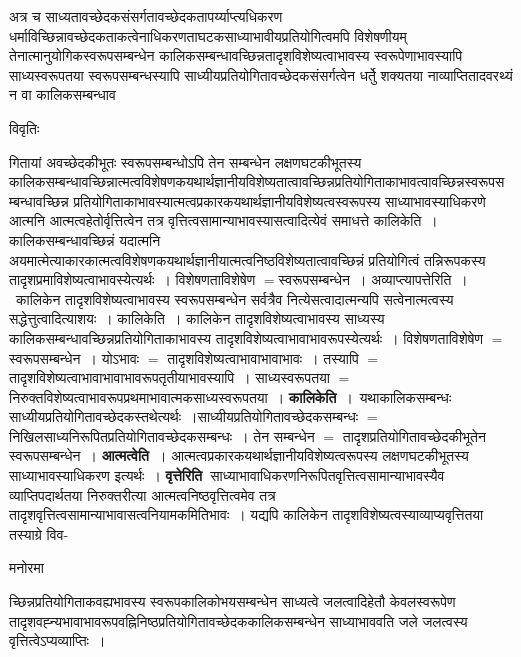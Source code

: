 \documentclass[10pt, openany]{book}
\begin{document}
{अत्र च
साध्यतावच्छेदकसंसर्गतावच्छेदकतापर्य्याप्त्यधिकरण धर्माविच्छिन्नावच्छेदकताकत्वेनाधिकरणताघटकसाध्याभावीयप्रतियोगित्वमपि विशेषणीयम् तेनात्मानुयोगिकस्वरूपसम्बन्धेन कालिकसम्बन्धावच्छिन्नतादृशविशेष्यत्वाभावस्य स्वरूपेणाभावस्यापि साध्यस्वरूपतया स्वरूपसम्बन्धस्यापि
साध्यीयप्रतियोगितावच्छेदकसंसर्गत्वेन धर्तेु शक्यतया नाव्याप्तितादवरथ्यं न वा कालिकसम्बन्धाव
\newpage
\begin{center}     विवृतिः \end{center}
गितायां अवच्छेदकीभूतः स्वरूपसम्बन्धोऽपि तेन सम्बन्धेन लक्षणघटकीभूतस्य
कालिकसम्बन्धावच्छिन्नात्मत्वविशेषणकयथार्थज्ञानीयविशेष्यतात्वावच्छिन्नप्रतियोगिताकाभावत्वावच्छिन्नस्वरूपसम्बन्धावच्छिन्न प्रतियोगिताकाभावस्यात्मत्वप्रकारकयथार्थज्ञानीयविशेष्यत्वस्वरूपस्य साध्याभावस्याधिकरणे आत्मनि आत्मत्वहेतोर्वृत्तित्वेन तत्र वृत्तित्वसामान्याभावस्यासत्वादित्येवं समाधत्ते {\qt कालिकेति~}। कालिकसम्बन्धावच्छिन्नं यदात्मनि अयमात्मेत्याकारकात्मत्वविशेषणकयथार्थज्ञानीयात्मत्वनिष्ठविशेष्यतात्वावच्छिन्नं प्रतियोगित्वं तन्निरूपकस्य तादृशप्रमाविशेष्यत्वाभावस्येत्यर्थः~। विशेषणताविशेषेण $=$स्वरूपसम्बन्धेन~। {\qt अव्याप्त्यापत्तेरिति~}।~कालिकेन तादृशविशेष्यत्वाभावस्य स्वरूपसम्बन्धेन सर्वत्रैव नित्येसत्वादात्मन्यपि सत्वेनात्मत्वस्य सद्धेत्तुत्वादित्याशयः~। {\qt कालिकेति~}। कालिकेन तादृशविशेष्यत्वाभावस्य साध्यस्य कालिकसम्बन्धावच्छिन्नप्रतियोगिताकाभावस्य तादृशविशेष्यत्वाभावाभावरूपस्येत्यर्थः~। विशेषणताविशेषेण $=$ स्वरूपसम्बन्धेन~। योऽभावः $=$ तादृशविशेष्यत्वाभावाभावाभावः~। तस्यापि $=$ तादृशविशेष्यत्वाभावाभावाभावरूपतृतीयाभावस्यापि~। साध्यस्वरूपतया $=$ निरुक्तविशेष्यत्वाभावरूपप्रथमाभावात्मकसाध्यस्वरूपतया~। \textbf {\qt कालिकेति}~।~यथाकालिकसम्बन्धः साध्यीयप्रतियोगितावच्छेदकस्तथेत्यर्थः~।साध्यीयप्रतियोगितावच्छेदकसम्बन्धः $=$ निखिलसाध्यनिरूपितप्रतियोगितावच्छेदकसम्बन्धः~। तेन सम्बन्धेन $=$ तादृशप्रतियोगितावच्छेदकीभूतेन स्वरूपसम्बन्धेन~। \textbf {\qt आत्मत्वेति~}। आत्मत्वप्रकारकयथार्थज्ञानीयविशेष्यत्वरूपस्य लक्षणघटकीभूतस्य साध्याभावस्याधिकरण इत्यर्थः~। \textbf {\qt वृत्तेरिति~}साध्याभावाधिकरणनिरूपितवृत्तित्वसामान्याभावस्यैव व्याप्तिपदार्थतया निरुक्तरीत्या आत्मत्वनिष्ठवृत्तित्वमेव तत्र तादृशवृत्तित्वसामान्याभावासत्वनियामकमितिभावः~। यद्यपि कालिकेन तादृशविशेष्यत्वस्याव्याप्यवृत्तितया तस्याग्रे विव-
\begin{center}   मनोरमा  \end{center}
च्छिन्नप्रतियोगिताकवह्यभावस्य स्वरूपकालिकोभयसम्बन्धेन साध्यत्वे जलत्वादिहेतौ केवलस्वरूपेण तादृशवह्न्यभावाभावरूपवह्निनिष्ठप्रतियोगितावच्छेदककालिकसम्बन्धेन
साध्याभाववति जले जलत्वस्य वृत्तित्वेऽप्यव्याप्तिः~।\\

}
\end{document}
